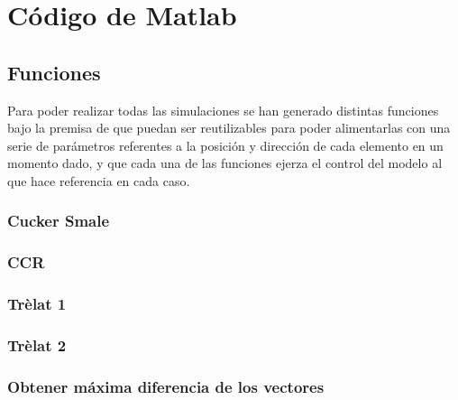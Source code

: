 \chapter{Código de Matlab} \label{a1}

\section{Funciones} \label{a1_functions}
Para poder realizar todas las simulaciones se han generado distintas funciones bajo la premisa de que puedan ser reutilizables para poder alimentarlas con una serie de parámetros referentes a la posición y dirección de cada elemento en un momento dado, y que cada una de las funciones ejerza el control del modelo al que hace referencia en cada caso.

\subsection{Cucker Smale}\label{a1_1_CS}



\subsection{CCR}\label{a1_2_CCR}


\subsection{Trèlat 1}\label{a1_3_trelat1}


\subsection{Trèlat 2}\label{a1_4_trelat2}


\subsection{Obtener máxima diferencia de los vectores}\label{a1_5_max_dif}


